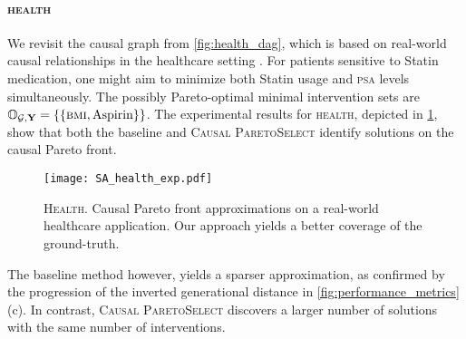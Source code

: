 \paragraph{\textsc{health}} We revisit the causal graph from \cref{fig:health_dag}, which is based on real-world causal relationships in the healthcare setting \cite{ferro_healthcare}. 
For patients sensitive to Statin medication, one might aim to minimize both Statin usage and \textsc{psa} levels simultaneously. 
The possibly Pareto-optimal minimal intervention sets are $\mathbb{O}_{\mathcal{G},\mathbf{Y}} = \{ \{\textsc{bmi}, \text{Aspirin} \} \}$. 
The experimental results for \textsc{health}, depicted in \cref{fig:health_fronts}, show that both the baseline and \textsc{Causal ParetoSelect} identify solutions on the causal Pareto front.
\begin{figure}[b]
\centering
\vspace{-1.8cm}
\texttt{[image: SA\_health\_exp.pdf]}
\vspace{-2.6cm}
\caption{\textsc{Health}. Causal Pareto front approximations on a real-world healthcare application. Our approach yields a better coverage of the ground-truth.}
\label{fig:health_fronts}
\end{figure}
The baseline method however, yields a sparser approximation, as confirmed by the progression of the inverted generational distance in \cref{fig:performance_metrics} (c). 
In contrast, \textsc{Causal ParetoSelect} discovers a larger number of solutions with the same number of interventions.

